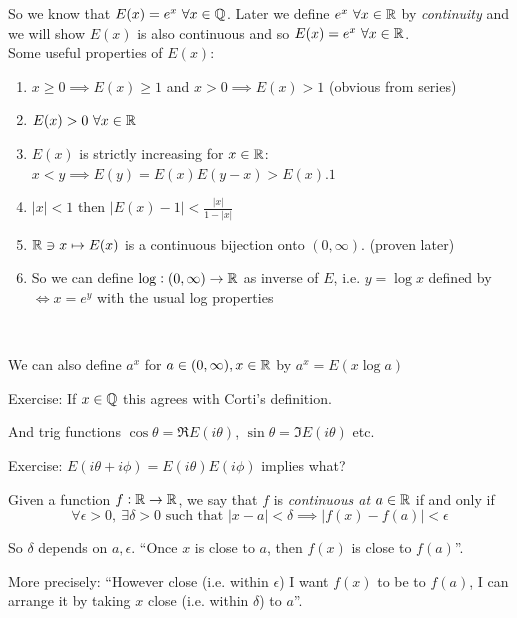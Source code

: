 \documentclass[twoside]{scrartcl}
\begin{document}
So we know that $E(x) = e^x ~\forall x \in\mathbb{Q}$. Later we define $e^x~\forall x\in\mathbb{R}$ by \emph{continuity} and we will show $E(x)$ is also continuous and so $E(x) = e^x~\forall x\in\mathbb{R}$. \\
 
 
Some  useful properties of $E(x)$:
\begin{enumerate}
\item $x \geq 0 \implies E(x) \geq 1$ and $x > 0 \implies E(x) > 1$ (obvious from series)
\item $E(x) > 0~\forall x \in\mathbb{R}$
\item $E(x)$ is strictly increasing for $x\in\mathbb{R}$: $x < y \implies E(y) = E(x)E(y-x) > E(x).1$
\item $|x| < 1$ then $|E(x) - 1| < \frac{|x|}{1-|x|}$
\item $\mathbb{R} \ni x \mapsto E(x)$ is a continuous bijection onto $(0,\infty)$. (proven later)
\item So we can define $\log: (0,\infty) \to \mathbb{R}$ as inverse of $E$, i.e. $y = \log x$ defined by $\iff x = e^y$ with the usual log properties
\end{enumerate}~

We can also define $a^x$ for $a \in(0,\infty),x\in \mathbb{R}$ by $a^x = E(x\log a)$

Exercise: If $x \in\mathbb{Q}$ this agrees with Corti's definition. 

And trig functions $\cos \theta = \Re E(i\theta)$, $\sin \theta = \Im E(i\theta)$ etc. 

Exercise: $E(i\theta + i\phi) = E(i\theta)E(i\phi)$ implies what?
	





\begin{definition}
	Given a function $f: \mathbb{R} \to \mathbb{R}$, we say that $f$ is \emph{continuous at $a \in\mathbb{R}$} if and only if 
	\[\forall \epsilon >0, ~\exists \delta >0 \text{ such that } |x-a| < \delta \implies |f(x) - f(a)| < \epsilon \]
\end{definition}

So $\delta$ depends on $a, \epsilon$. ``Once $x$ is close to $a$, then $f(x)$ is close to $f(a)$''.

More precisely: ``However close (i.e. within $\epsilon$) I want $f(x)$ to be to $f(a)$, I can arrange it by taking $x$ close (i.e. within $\delta$) to $a$''.
\end{document}
